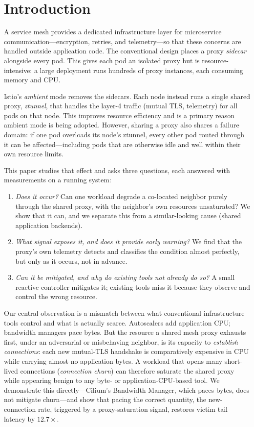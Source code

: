 \documentclass[10pt,twocolumn]{article}
\begin{document}
\section{Introduction}
A service mesh provides a dedicated infrastructure layer for microservice
communication---encryption, retries, and telemetry---so that these concerns are handled
outside application code. The conventional design places a proxy \emph{sidecar} alongside
every pod. This gives each pod an isolated proxy but is resource-intensive: a large
deployment runs hundreds of proxy instances, each consuming memory and CPU.

Istio's \emph{ambient} mode removes the sidecars. Each node instead runs a single shared
proxy, \emph{ztunnel}, that handles the layer-4 traffic (mutual TLS, telemetry) for all
pods on that node. This improves resource efficiency and is a primary reason ambient mode
is being adopted. However, sharing a proxy also shares a failure domain: if one pod
overloads its node's ztunnel, every other pod routed through it can be affected---including
pods that are otherwise idle and well within their own resource limits.

This paper studies that effect and asks three questions, each answered with measurements
on a running system:
\begin{enumerate}
\item \emph{Does it occur?} Can one workload degrade a co-located neighbor purely through
the shared proxy, with the neighbor's own resources unsaturated? We show that it can, and
we separate this from a similar-looking cause (shared application backends).
\item \emph{What signal exposes it, and does it provide early warning?} We find that the
proxy's own telemetry detects and classifies the condition almost perfectly, but only as
it occurs, not in advance.
\item \emph{Can it be mitigated, and why do existing tools not already do so?} A small
reactive controller mitigates it; existing tools miss it because they observe and control
the wrong resource.
\end{enumerate}

Our central observation is a mismatch between what conventional infrastructure tools
control and what is actually scarce. Autoscalers add application CPU; bandwidth managers
pace bytes. But the resource a shared mesh proxy exhausts first, under an adversarial or
misbehaving neighbor, is its capacity to \emph{establish connections}: each new mutual-TLS
handshake is comparatively expensive in CPU while carrying almost no application bytes. A
workload that opens many short-lived connections (\emph{connection churn}) can therefore
saturate the shared proxy while appearing benign to any byte- or application-CPU-based
tool. We demonstrate this directly---Cilium's Bandwidth Manager, which paces bytes, does
not mitigate churn---and show that pacing the correct quantity, the new-connection rate,
triggered by a proxy-saturation signal, restores victim tail latency by $12.7\times$.
\end{document}
